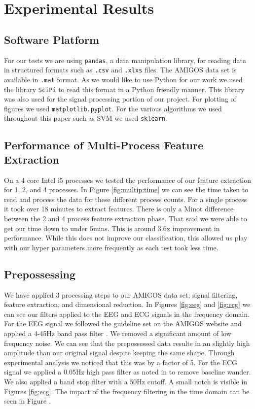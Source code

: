 \section{Experimental Results}
\label{sec:experimental_results}
\subsection{Software Platform}
For our tests we are using \texttt{pandas},
a data manipulation library,
for reading data in structured formats such as
\texttt{.csv} and \texttt{.xlxs} files.
The AMIGOS data set is available in \texttt{.mat} format.
As we would like to use Python for our work we used
the library \texttt{SciPi} to read this format in a Python friendly manner.
This library was also used for the signal processing portion of our project.
For plotting of figures we used \texttt{matplotlib.pyplot}.
For the various algorithms we used throughout this paper such as SVM we
used \texttt{sklearn}.


\subsection{Performance of Multi-Process Feature Extraction}
On a 4 core Intel i5 processes we tested the performance of our feature extraction
for 1, 2, and 4 processes.
In Figure \ref{fig:multip:time} we can see the time taken to read and process
the data for these different process counts.
For a single process it took over 18 minutes to extract features.
There is only a Minot difference between the 2 and 4 process feature extraction phase.
That said we were able to get our time down to under 5mins.
This is around 3.6x improvement in performance.
While this does not improve our classification, this allowed us play
with our hyper parameters more frequently as each test took less time.


\subsection{Prepossessing}
We have applied 3 processing steps to our AMIGOS data set;
signal filtering, feature extraction, and dimensional reduction.
In Figures \ref{fig:eeg} and \ref{fig:ecg}
we can see our filters applied to the EEG and ECG signals in the frequency domain.
For the EEG signal we followed the guideline set on the AMIGOS
website and applied a 4-45Hz band pass filter \cite{AMIGOS:2018}.
We removed a significant amount of low frequency noise.
We can see that the prepossessed data results
in an slightly high amplitude than our original signal despite keeping the same shape.
Through experimental analysis we noticed that this was by a factor of 5.
For the ECG signal we applied a 0.05Hz high pass filter as noted in
\cite{SantamariaGranados:2019}
to remove baseline wander.
We also applied a band stop filter with a 50Hz cutoff.
A small notch is visible in
Figures \ref{fig:ecg}.
The impact of the frequency filtering in the time domain can be seen in Figure
\label{fig:ecg:time}.

